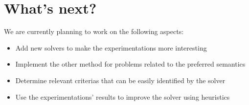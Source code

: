 \documentclass[11pt]{article}
\begin{document}
\section{What's next?}
We are currently planning to work on the following aspects:
\begin{itemize}
\item Add new solvers to make the experimentations more interesting
\item Implement the other method for problems related to the preferred semantics
\item Determine relevant criterias that can be easily identified by the solver
\item Use the experimentations' results to improve the solver using heuristics
\end{itemize}



\end{document}
